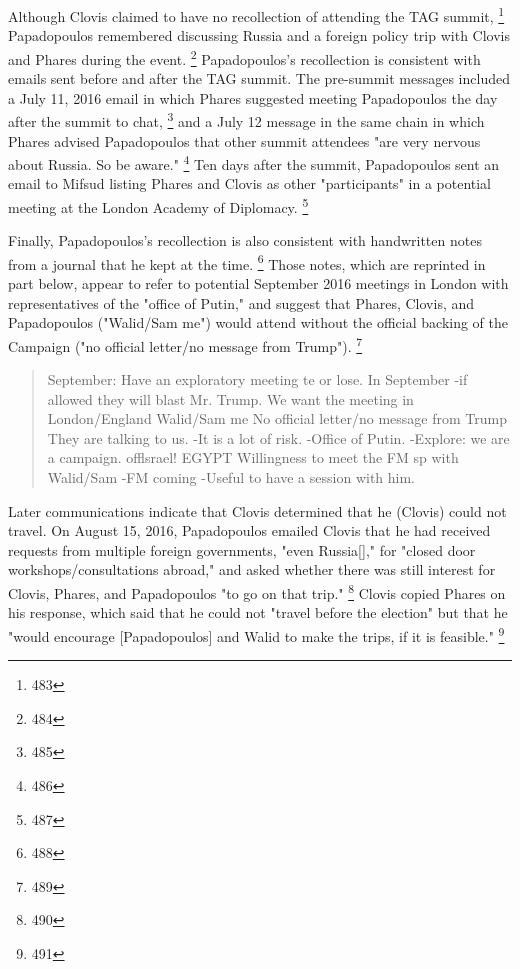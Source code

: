 
Although Clovis claimed to have no recollection of attending the TAG summit,%
\footnote{483}
Papadopoulos remembered discussing Russia and a foreign policy trip with Clovis and Phares during the event.%
\footnote{484}
Papadopoulos's recollection is consistent with emails sent before and after the TAG summit.
The pre-summit messages included a July 11, 2016 email in which Phares suggested meeting Papadopoulos the day after the summit to chat,%
\footnote{485}
and a July 12 message in the same chain in which Phares advised Papadopoulos that other summit attendees "are very nervous about Russia. So be aware."%
\footnote{486}
Ten days after the summit, Papadopoulos sent an email to Mifsud listing Phares and Clovis as other "participants" in a potential meeting at the London Academy of Diplomacy.%
\footnote{487}

Finally, Papadopoulos's recollection is also consistent with handwritten notes from a journal that he kept at the time.%
\footnote{488}
Those notes, which are reprinted in part below, appear to refer to potential September 2016 meetings in London with representatives of the "office of Putin," and suggest that Phares, Clovis, and Papadopoulos ("Walid/Sam me") would attend without the official backing of the Campaign ("no official letter/no message from Trump").%
\footnote{489}


\begin{quote}
September: Have an exploratory meeting te or lose. In September -if allowed they will blast Mr. Trump. We want the meeting in London/England Walid/Sam me No official letter/no message from Trump They are talking to us. -It is a lot of risk. -Office of Putin. -Explore: we are a campaign. offlsrael! EGYPT Willingness to meet the FM sp with Walid/Sam -FM coming -Useful to have a session with him.
\end{quote}

Later communications indicate that Clovis determined that he (Clovis) could not travel.
On August 15, 2016, Papadopoulos emailed Clovis that he had received requests from multiple foreign governments, "even Russia[]," for "closed door workshops/consultations abroad," and asked whether there was still interest for Clovis, Phares, and Papadopoulos "to go on that trip."%
\footnote{490}
Clovis copied Phares on his response, which said that he could not "travel before the election" but that he "would encourage [Papadopoulos] and Walid to make the trips, if it is feasible."%
\footnote{491}

